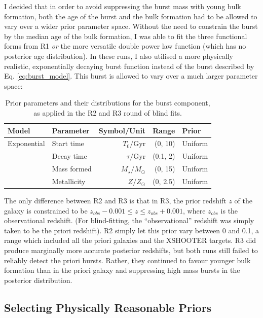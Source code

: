 \documentclass[a4paper,11pt]{article}
\begin{document}
I decided that in order to avoid suppressing the burst mass with young bulk formation, both the age of the burst and the bulk formation had to be allowed to vary over a wider prior parameter space. Without the need to constrain the burst by the median age of the bulk formation, I was able to fit the three functional forms from R1 \textit{or} the more versatile double power law function (which has no posterior age distribution). In these runs, I also utilised a more physically realistic, exponentially decaying burst function instead of the burst described by Eq. \ref{eq:burst_model}. This burst is allowed to vary over a much larger parameter space:

\begin{table}[h]
  \centering
  \begin{tabular}{l l r r l}
    Model       & Parameter   & Symbol/Unit         & Range    & Prior   \\
    \hline \hline
    Exponential & Start time  & $T_0/\mathrm{Gyr}$  & (0, 10)  & Uniform \\ %
                & Decay time  & $\tau/\mathrm{Gyr}$ & (0.1, 2) & Uniform \\
                & Mass formed & $M_\star/M_\odot$   & (0, 15)  & Uniform \\
                & Metallicity & $Z/Z_\odot$         & (0, 2.5) & Uniform \\
  \end{tabular}
  \caption{Prior parameters and their distributions for the burst component, as applied in the R2 and R3 round of blind fits.}
  \label{tab:r2_r3_burst_priors}
\end{table}

The only difference between R2 and R3 is that in R3, the prior redshift $z$ of the galaxy is constrained to be $z_{obs} - 0.001 \leq z \leq z_{obs} + 0.001$, where $z_{obs}$ is the observational redshift. (For blind-fitting, the ``observational'' redshift was simply taken to be the priori redshift). R2 simply let this prior vary between 0 and 0.1, a range which included all the priori galaxies and the XSHOOTER targets. R3 did produce marginally more accurate posterior redshifts, but both runs still failed to reliably detect the priori bursts. Rather, they continued to favour younger bulk formation than in the priori galaxy and suppressing high mass bursts in the posterior distribution.

\subsection{Selecting Physically Reasonable Priors}\label{sec:prior_selection}
\end{document}
